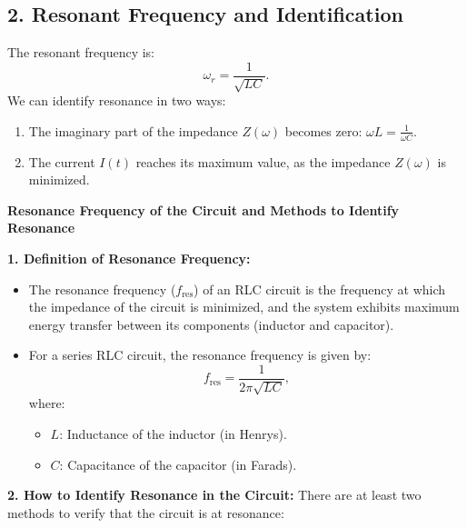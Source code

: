 \documentclass[a4paper,11pt]{article}
\begin{document}
\subsection*{2. Resonant Frequency and Identification}
The resonant frequency is:
\[
\omega_r = \frac{1}{\sqrt{LC}}.
\]
We can identify resonance in two ways:
\begin{enumerate}
    \item The imaginary part of the impedance \(Z(\omega)\) becomes zero: \(\omega L = \frac{1}{\omega C}\).
    \item The current \(I(t)\) reaches its maximum value, as the impedance \(Z(\omega)\) is minimized.
\end{enumerate}


        \textbf{Resonance Frequency of the Circuit and Methods to Identify Resonance}

        \textbf{1. Definition of Resonance Frequency:}
        \begin{itemize}
            \item The resonance frequency (\( f_{\text{res}} \)) of an RLC circuit is the frequency at which the impedance of the circuit is minimized, and the system exhibits maximum energy transfer between its components (inductor and capacitor).
            \item For a series RLC circuit, the resonance frequency is given by:
            \[
            f_{\text{res}} = \frac{1}{2\pi \sqrt{LC}},
            \]
            where:
            \begin{itemize}
                \item \( L \): Inductance of the inductor (in Henrys).
                \item \( C \): Capacitance of the capacitor (in Farads).
            \end{itemize}
        \end{itemize}

        \textbf{2. How to Identify Resonance in the Circuit:}
        There are at least two methods to verify that the circuit is at resonance:
        
\end{document}
